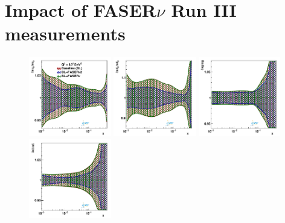 \section{Impact of FASER$\nu$ Run III measurements}
\label{app:fasernu_runIII_impact}

\begin{figure}[htbp]
	\centering
	\includegraphics[width=0.32\textwidth]{plots/proton_fasernu2/FASERv2_vs_FASERv/statOnly_FASERv_q2_10000_pdf_uv_ratio.pdf}
	\includegraphics[width=0.32\textwidth]{plots/proton_fasernu2/FASERv2_vs_FASERv/statOnly_FASERv_q2_10000_pdf_dv_ratio.pdf}
	\includegraphics[width=0.32\textwidth]{plots/proton_fasernu2/FASERv2_vs_FASERv/statOnly_FASERv_q2_10000_pdf_g_ratio.pdf}\\
	\includegraphics[width=0.32\textwidth]{plots/proton_fasernu2/FASERv2_vs_FASERv/statOnly_FASERv_q2_10000_pdf_Sea_ratio.pdf}

\end{figure}
